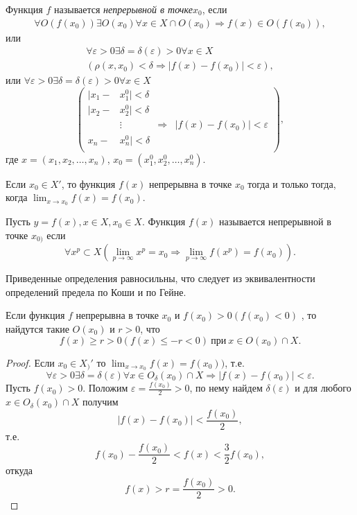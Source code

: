 \begin{definition}
    Функция $f$ называется \emph{непрерывной в точке}$x_0$, если 
    \begin{multline}
        \forall O(f(x_{0}))\exists O(x_{0})\forall x\in X\cap O(x_{0})\Rightarrow f(x)\in O(f(x_{0})),
    \end{multline}
    или 
    \begin{multline}
        \forall \varepsilon>0\exists\delta=\delta(\varepsilon)>0\forall x\in X \\
        (\rho(x,x_{0})<\delta\Rightarrow|f(x)-f(x_{0})|<\varepsilon),
    \end{multline}
    или $\forall \varepsilon>0 \exists\delta=\delta(\varepsilon)>0 \forall x\in X$
    \[\left( 
        \begin{aligned}
            |x_{1}-&x_{1}^{0}|<\delta & & \\
            |x_{2}-&x_{2}^{0}|<\delta & & \\
            &\vdots & \Rightarrow & |f(x)-f(x_{0})|<\varepsilon\\
            x_{n}-&x_{n}^{0}|<\delta \\
        \end{aligned} \right),
    \]
    где $x= (x_{1},x_{2}, \ldots ,x_{n})$, $x_{0}=(x_{1}^{0},x_{2}^{0},\ldots , x_{n}^{0})$.
\end{definition}
Если $x_0 \in X'$, то функция $f(x)$ непрерывна в точке $x_0$ тогда и только тогда,
когда $\displaystyle \lim_{x \rightarrow x_0}f(x) = f(x_0)$.
\begin{definition}
    Пусть $y=f(x),x\in X, x_{0}\in X.$
    Функция $f(x)$ называется непрерывной в точке $x_{0)}$ если
    \[
    \forall{x^{p}}\subset X \left(\lim_{p\rightarrow\infty}x^{p}=x_{0}\Rightarrow\lim_{p\rightarrow\infty}f(x^{p})=f(x_{0})\right) .
    \]
\end{definition}
Приведенные определения равносильны, что следует из эквивалентности определений предела по Коши и по Гейне.
\begin{theorem}
    Если функция $f$ непрерывна в точке
    $x_{0}$ и $f(x_{0})>0(f(x_{0})<0)$ , то найдутся такие $O(x_{0})$ и $r>0$, что
    \[f(x)\geqslant r>0 (f(x)\leqslant-r<0)~\text{при}~x\in O(x_{0})\cap X.\]
\end{theorem}
\begin{proof}
    Если $x_{0}\in X_{)}'$ то $\displaystyle \lim_{x\rightarrow x_{0}}f(x)=f(x_{0}))$, т.е.
    \[\forall \varepsilon>0\exists\delta=\delta(\varepsilon)\forall x\in O_{\delta}(x_{0})\cap X\Rightarrow|f(x)-f(x_{0})|<\varepsilon.\]
    Пусть $f(x_{0})>0$. Положим $\displaystyle \varepsilon=\frac{f(x_{0})}{2}>0$, по нему найдем $\delta(\varepsilon)$ и для любого $x\in O_{\delta}(x_{0})\cap X$ получим
    \[|f(x)-f(x_{0})|<\frac{f(x_{0})}{2},\]
    т.е.
    \[f(x_{0})-\frac{f(x_{0})}{2}<f(x)<\frac{3}{2}f(x_{0}),\]
    откуда
    \[f(x)>r=\frac{f(x_{0})}{2}>0.\]
\end{proof}

